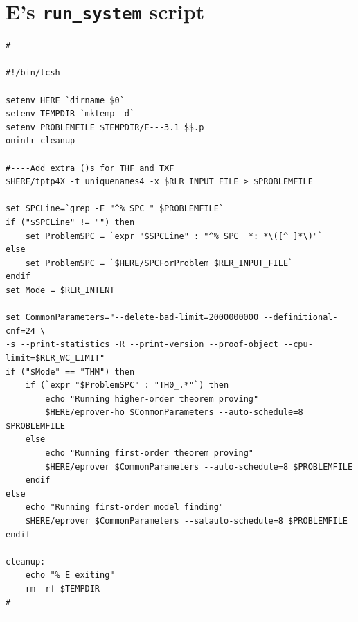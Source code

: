 \documentclass{easychair}
\begin{document}
\section{E's {\tt run\_system} script}
\label{E_run_system}
{\small
\begin{verbatim}
#--------------------------------------------------------------------------------
#!/bin/tcsh

setenv HERE `dirname $0`
setenv TEMPDIR `mktemp -d`
setenv PROBLEMFILE $TEMPDIR/E---3.1_$$.p
onintr cleanup

#----Add extra ()s for THF and TXF
$HERE/tptp4X -t uniquenames4 -x $RLR_INPUT_FILE > $PROBLEMFILE

set SPCLine=`grep -E "^% SPC " $PROBLEMFILE`
if ("$SPCLine" != "") then
    set ProblemSPC = `expr "$SPCLine" : "^% SPC  *: *\([^ ]*\)"`
else
    set ProblemSPC = `$HERE/SPCForProblem $RLR_INPUT_FILE`
endif
set Mode = $RLR_INTENT

set CommonParameters="--delete-bad-limit=2000000000 --definitional-cnf=24 \
-s --print-statistics -R --print-version --proof-object --cpu-limit=$RLR_WC_LIMIT"
if ("$Mode" == "THM") then
    if (`expr "$ProblemSPC" : "TH0_.*"`) then
        echo "Running higher-order theorem proving"
        $HERE/eprover-ho $CommonParameters --auto-schedule=8 $PROBLEMFILE
    else
        echo "Running first-order theorem proving"
        $HERE/eprover $CommonParameters --auto-schedule=8 $PROBLEMFILE
    endif
else 
    echo "Running first-order model finding"
    $HERE/eprover $CommonParameters --satauto-schedule=8 $PROBLEMFILE
endif

cleanup:
    echo "% E exiting"
    rm -rf $TEMPDIR
#--------------------------------------------------------------------------------
\end{verbatim}
}

\newpage
\end{document}
